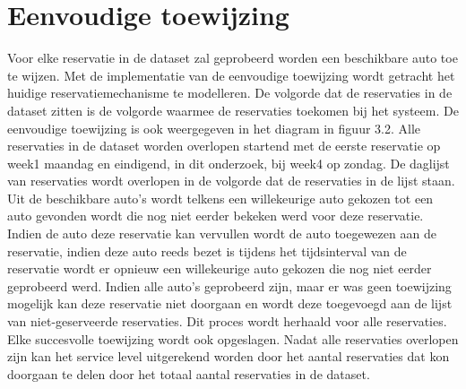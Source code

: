 \section{Eenvoudige toewijzing}
Voor elke reservatie in de dataset zal geprobeerd worden een beschikbare auto toe te wijzen. Met de implementatie van de eenvoudige toewijzing wordt getracht het huidige reservatiemechanisme te modelleren. De volgorde dat de reservaties in de dataset zitten is de volgorde waarmee de reservaties toekomen bij het systeem. De eenvoudige toewijzing is ook weergegeven in het diagram in figuur 3.2. Alle reservaties in de dataset worden overlopen startend met de eerste reservatie op week1 maandag en eindigend, in dit onderzoek, bij week4 op zondag. De daglijst van reservaties wordt overlopen in de volgorde dat de reservaties in de lijst staan. Uit de beschikbare auto's wordt telkens een willekeurige auto gekozen tot een auto gevonden wordt die nog niet eerder bekeken werd voor deze reservatie. Indien de auto deze reservatie kan vervullen wordt de auto toegewezen aan de reservatie, indien deze auto reeds bezet is tijdens het tijdsinterval van de reservatie wordt er opnieuw een willekeurige auto gekozen die nog niet eerder geprobeerd werd. Indien alle auto's geprobeerd zijn, maar er was geen toewijzing mogelijk kan deze reservatie niet doorgaan en wordt deze toegevoegd aan de lijst van niet-geserveerde reservaties. Dit proces wordt herhaald voor alle reservaties. Elke succesvolle toewijzing wordt ook opgeslagen. Nadat alle reservaties overlopen zijn kan het service level uitgerekend worden door het aantal reservaties dat kon doorgaan te delen door het totaal aantal reservaties in de dataset. 
